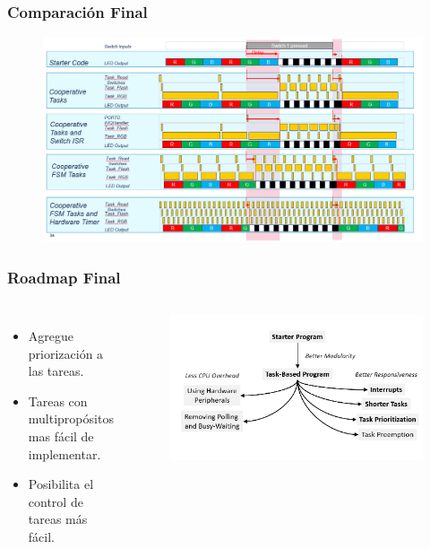 \documentclass[10.5pt,scale=1.0,t,aspectratio=169,hyperref={pdfpagelabels=false}]{beamer}
\begin{document}
\begin{frame}
	\frametitle{Comparación Final}
	\begin{figure}
		\centering
		\includegraphics[scale=0.4]{18_Comparisson}
	\end{figure}	
\end{frame}
\begin{frame}
	\frametitle{Roadmap Final}
	\begin{columns}
		\begin{itemize}
			\item Agregue priorización a las tareas.
			\item Tareas con multipropósitos mas fácil de implementar. 
			\item Posibilita el control de tareas más fácil. 
		\end{itemize}
	\begin{figure}
		\centering
		\includegraphics[scale=0.3]{19_RoadmapFinal}
	\end{figure}
\end{columns}
\end{frame}
\end{document}
